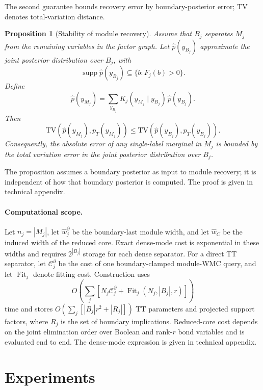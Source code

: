 \documentclass[letterpaper]{article}
\newif\ifincludesupplement
\newcommand{\suppref}[1]{\ifincludesupplement Appendix~\csname ref\endcsname{#1}\else technical appendix\fi}
\newtheorem{proposition}{Proposition}
\begin{document}
The second guarantee bounds recovery error by boundary-posterior error;
\(\mathrm{TV}\) denotes total-variation distance.

\begin{proposition}[Stability of module recovery]
\label{prop:boundary-error}
Assume that \(B_j\) separates \(M_j\) from the remaining variables in the
factor graph. Let \(\widehat{p}(y_{B_j})\) approximate the joint posterior
distribution over \(B_j\), with
\[
\operatorname{supp}\widehat p(y_{B_j})
\subseteq
\{b:F_j(b)>0\}.
\]
Define
\[
\widehat{p}(y_{M_j})
=
\sum_{y_{B_j}}
K_j(y_{M_j}\mid y_{B_j})\,\widehat{p}(y_{B_j}).
\]
Then
\[
\mathrm{TV}\!\left(
\widehat{p}(y_{M_j}),p_T(y_{M_j})
\right)
\le
\mathrm{TV}\!\left(
\widehat{p}(y_{B_j}),p_T(y_{B_j})
\right).
\]
Consequently, the absolute error of any single-label marginal in \(M_j\)
is bounded by the total variation error in the joint posterior
distribution over \(B_j\).
\end{proposition}

The proposition assumes a boundary posterior as input to module
recovery; it is independent of how that boundary posterior is computed.
The proof is given in \suppref{app:boundary-error-proof}.

\paragraph{Computational scope.}
Let \(n_j=|M_j|\), let \(\widehat w_j^\partial\) be the boundary-last
module width, and let \(\widehat w_C\) be the induced width of the
reduced core. Exact dense-mode cost is exponential in these widths and
requires \(2^{|B_j|}\) storage for each dense separator. For a direct TT
separator, let \(\mathcal C_j^\partial\) be the
cost of one boundary-clamped module-WMC query, and let
\(\operatorname{Fit}_j\) denote fitting cost. Construction uses
\[
O\!\left(
\sum_j\!\left[N_j\mathcal C_j^\partial+
\operatorname{Fit}_j(N_j,|B_j|,r)\right]
\right)
\]
time and stores \(O(\sum_j[|B_j|r^2+|R_j|])\) TT parameters and projected
support factors, where \(R_j\) is the set of boundary implications.
Reduced-core cost depends on the joint elimination order over Boolean and
rank-\(r\) bond variables and is evaluated end to end. The dense-mode
expression is given in \suppref{app:dense-cost}.

\section{Experiments}
\label{sec:experiments}
\end{document}

